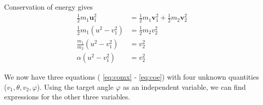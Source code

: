 \documentclass[twoside,english]{uiofysmaster/uiofysmaster}
\let\orgautoref\autoref
\renewcommand{\autoref}
        {%
		 \def\sectionautorefname{Section}%
		 \def\subsectionautorefname{Section}%
		 \def\subsubsectionautorefname{Section}%
		 \def\chapterautorefname{Chapter}%
          \orgautoref}
\begin{document}
\begin{appendices}
Conservation of energy gives
\begin{align}\label{eq:coe}
	\tfrac{1}{2} m_1 \boldsymbol{u}_1^2 &= \tfrac{1}{2} m_1 \boldsymbol{v}_1^2 + \tfrac{1}{2} m_2 \boldsymbol{v}_2^2 \nonumber\\
	\tfrac{1}{2} m_1 (u^2 - v_1^2) &= \tfrac{1}{2} m_2 v_2^2 \nonumber\\
	\frac{m_1}{m_2} (u^2 - v_1^2) &= v_2^2 \nonumber\\
	\alpha (u^2 - v_1^2) &= v_2^2
\end{align}

We now have three equations (\autoref{eq:comx} - \autoref{eq:coe}) with four unknown quantities ($v_1, \theta, v_2, \varphi$). Using the target angle $\varphi$ as an independent variable, we can find expressions for the other three variables. 


\end{appendices}
\end{document}
